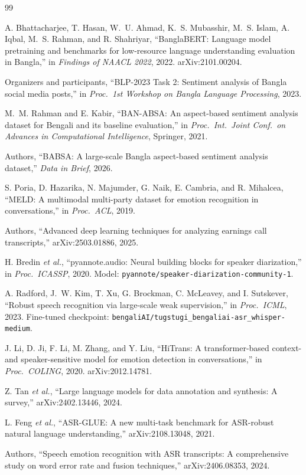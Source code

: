 \documentclass[11pt,a4paper]{article}
\begin{document}
\begin{thebibliography}{99}\small

 A. Bhattacharjee, T. Hasan, W.~U. Ahmad, K.~S. Mubasshir, M.~S. Islam,
A. Iqbal, M.~S. Rahman, and R. Shahriyar, ``BanglaBERT: Language model pretraining and benchmarks
for low-resource language understanding evaluation in Bangla,'' in \emph{Findings of NAACL 2022},
2022. arXiv:2101.00204.

 Organizers and participants, ``BLP-2023 Task 2: Sentiment analysis of Bangla
social media posts,'' in \emph{Proc.\ 1st Workshop on Bangla Language Processing}, 2023.

 M.~M. Rahman and E. Kabir, ``BAN-ABSA: An aspect-based sentiment analysis
dataset for Bengali and its baseline evaluation,'' in \emph{Proc.\ Int.\ Joint Conf.\ on Advances
in Computational Intelligence}, Springer, 2021.

 Authors, ``BABSA: A large-scale Bangla aspect-based sentiment analysis dataset,''
\emph{Data in Brief}, 2026.

 S. Poria, D. Hazarika, N. Majumder, G. Naik, E. Cambria, and R. Mihalcea,
``MELD: A multimodal multi-party dataset for emotion recognition in conversations,'' in
\emph{Proc.\ ACL}, 2019.

 Authors, ``Advanced deep learning techniques for analyzing earnings call
transcripts,'' arXiv:2503.01886, 2025.

 H. Bredin \emph{et al.}, ``pyannote.audio: Neural building blocks for speaker
diarization,'' in \emph{Proc.\ ICASSP}, 2020. Model:
\texttt{pyannote/speaker-diarization-community-1}.

 A. Radford, J.~W. Kim, T. Xu, G. Brockman, C. McLeavey, and I. Sutskever,
``Robust speech recognition via large-scale weak supervision,'' in \emph{Proc.\ ICML}, 2023.
Fine-tuned checkpoint: \texttt{bengaliAI/tugstugi\_bengaliai-asr\_whisper-medium}.

 J. Li, D. Ji, F. Li, M. Zhang, and Y. Liu, ``HiTrans: A transformer-based
context- and speaker-sensitive model for emotion detection in conversations,'' in
\emph{Proc.\ COLING}, 2020. arXiv:2012.14781.

 Z. Tan \emph{et al.}, ``Large language models for data annotation and
synthesis: A survey,'' arXiv:2402.13446, 2024.

 L. Feng \emph{et al.}, ``ASR-GLUE: A new multi-task benchmark for ASR-robust
natural language understanding,'' arXiv:2108.13048, 2021.

 Authors, ``Speech emotion recognition with ASR transcripts: A comprehensive
study on word error rate and fusion techniques,'' arXiv:2406.08353, 2024.

\end{thebibliography}
\end{document}
